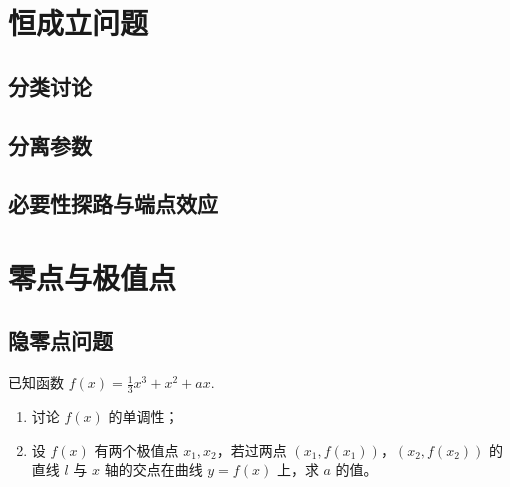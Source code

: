 \clearpage

\section{恒成立问题}
\subsection{分类讨论}
\clearpage
\subsection{分离参数}
\clearpage
\subsection{必要性探路与端点效应}

\clearpage
\section{零点与极值点}
\subsection{隐零点问题}
\begin{example}[2012大纲全国卷]
    已知函数 $f(x) = \frac{1}{3}x^3 + x^2 + ax$.

\begin{enumerate}
    \item 讨论 $f(x)$ 的单调性；
    \item 设 $f(x)$ 有两个极值点 $x_1, x_2$，若过两点 $(x_1, f(x_1))$，$(x_2, f(x_2))$ 的直线 $l$ 与 $x$ 轴的交点在曲线 $y = f(x)$ 上，求 $a$ 的值。
\end{enumerate}
\end{example}

